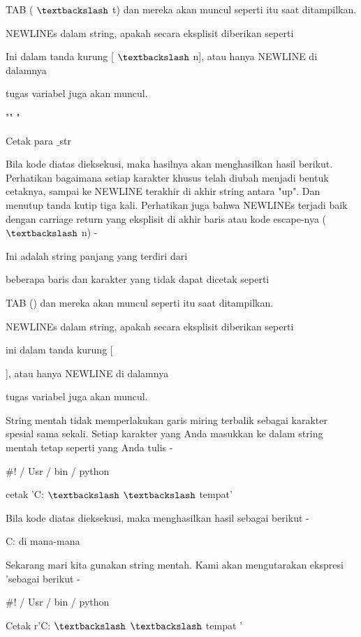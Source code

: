 TAB ( $  \textbackslash  $ t) dan mereka akan muncul seperti itu saat ditampilkan. \par
NEWLINEs dalam string, apakah secara eksplisit diberikan seperti \par
Ini dalam tanda kurung [ $  \textbackslash  $ n], atau hanya NEWLINE di dalamnya \par
tugas variabel juga akan muncul. \par
"" " \par
Cetak para $  \_  $str \par
Bila kode diatas dieksekusi, maka hasilnya akan menghasilkan hasil berikut. Perhatikan bagaimana setiap karakter khusus telah diubah menjadi bentuk cetaknya, sampai ke NEWLINE terakhir di akhir string antara "up". Dan menutup tanda kutip tiga kali. Perhatikan juga bahwa NEWLINEs terjadi baik dengan carriage return yang eksplisit di akhir baris atau kode escape-nya ( $  \textbackslash  $ n) - \par
Ini adalah string panjang yang terdiri dari \par
beberapa baris dan karakter yang tidak dapat dicetak seperti \par
TAB () dan mereka akan muncul seperti itu saat ditampilkan. \par
NEWLINEs dalam string, apakah secara eksplisit diberikan seperti \par
ini dalam tanda kurung [ \par
 ], atau hanya NEWLINE di dalamnya \par
tugas variabel juga akan muncul. \par
String mentah tidak memperlakukan garis miring terbalik sebagai karakter spesial sama sekali. Setiap karakter yang Anda masukkan ke dalam string mentah tetap seperti yang Anda tulis - \par
 $  \#  $! / Usr / bin / python \par
\vspace{12pt}
cetak 'C:  $  \textbackslash  $ $  \textbackslash  $ tempat' \par
Bila kode diatas dieksekusi, maka menghasilkan hasil sebagai berikut - \par
C: di mana-mana \par
Sekarang mari kita gunakan string mentah. Kami akan mengutarakan ekspresi 'sebagai berikut - \par
 $  \#  $! / Usr / bin / python \par
\vspace{12pt}
Cetak r'C:  $  \textbackslash  $ $  \textbackslash  $ tempat ' \par
